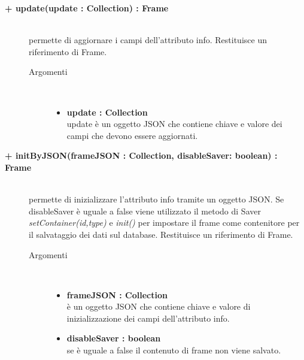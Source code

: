 \begin{description}
\begin{description}
\end{description}

\begin{description}
		\item[\textbf{\color{blue}+ update(update : Collection) : Frame			}] \hfill \\
			permette di aggiornare i campi dell'attributo info. Restituisce un riferimento di Frame.
			
		\begin{description}
			\item[Argomenti] \hfill \\
				\begin{itemize}
				
					\item \textbf{update : Collection			} \hfill \\
					update è un oggetto JSON che contiene chiave e valore dei campi che devono essere aggiornati. 
				\end{itemize}
		\end{description}

\end{description}

\begin{description}
		\item[\textbf{\color{blue}+ initByJSON(frameJSON : Collection, disableSaver: boolean) : Frame			}] \hfill \\
			permette di inizializzare l'attributo info tramite un oggetto JSON. Se disableSaver è uguale a false viene utilizzato il metodo di Saver \textit{setContainer(id,type)} e \textit{init()} per impostare il frame come contenitore per il salvataggio dei dati sul database. Restituisce un riferimento di Frame.
			
		\begin{description}
			\item[Argomenti] \hfill \\
				\begin{itemize}
				
					\item \textbf{frameJSON : Collection			} \hfill \\
					è un oggetto JSON che contiene chiave e valore di inizializzazione dei campi dell'attributo info. 
					\item \textbf{disableSaver : boolean			} \hfill \\
					se è uguale a false il contenuto di frame non viene salvato.  				
				\end{itemize}
		\end{description}


\end{description}
\end{description}
